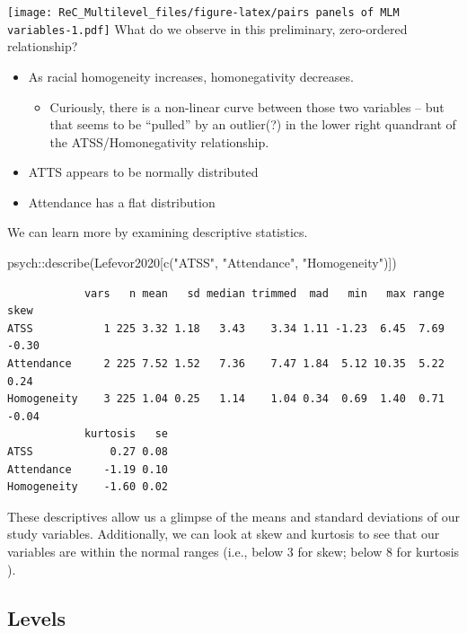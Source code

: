 \documentclass[
  english,
]{book}
\newenvironment{Shaded}{\begin{snugshade}}{\end{snugshade}}
\newcommand{\FunctionTok}[1]{\textcolor[rgb]{0.00,0.00,0.00}{#1}}
\newcommand{\NormalTok}[1]{#1}
\newcommand{\SpecialCharTok}[1]{\textcolor[rgb]{0.00,0.00,0.00}{#1}}
\newcommand{\StringTok}[1]{\textcolor[rgb]{0.31,0.60,0.02}{#1}}
\providecommand{\tightlist}{%
  \setlength{\itemsep}{0pt}\setlength{\parskip}{0pt}}
\begin{document}
\texttt{[image: ReC\_Multilevel\_files/figure-latex/pairs panels of MLM variables-1.pdf]}
What do we observe in this preliminary, zero-ordered relationship?

\begin{itemize}
\tightlist
\item
  As racial homogeneity increases, homonegativity decreases.

  \begin{itemize}
  \tightlist
  \item
    Curiously, there is a non-linear curve between those two variables -- but that seems to be ``pulled'' by an outlier(?) in the lower right quandrant of the ATSS/Homonegativity relationship.
  \end{itemize}
\item
  ATTS appears to be normally distributed
\item
  Attendance has a flat distribution
\end{itemize}

We can learn more by examining descriptive statistics.

\begin{Shaded}
\begin{Highlighting}[]
\NormalTok{psych}\SpecialCharTok{::}\FunctionTok{describe}\NormalTok{(Lefevor2020[}\FunctionTok{c}\NormalTok{(}\StringTok{"ATSS"}\NormalTok{, }\StringTok{"Attendance"}\NormalTok{, }\StringTok{"Homogeneity"}\NormalTok{)])}
\end{Highlighting}
\end{Shaded}

\begin{verbatim}
            vars   n mean   sd median trimmed  mad   min   max range  skew
ATSS           1 225 3.32 1.18   3.43    3.34 1.11 -1.23  6.45  7.69 -0.30
Attendance     2 225 7.52 1.52   7.36    7.47 1.84  5.12 10.35  5.22  0.24
Homogeneity    3 225 1.04 0.25   1.14    1.04 0.34  0.69  1.40  0.71 -0.04
            kurtosis   se
ATSS            0.27 0.08
Attendance     -1.19 0.10
Homogeneity    -1.60 0.02
\end{verbatim}

These descriptives allow us a glimpse of the means and standard deviations of our study variables. Additionally, we can look at skew and kurtosis to see that our variables are within the normal ranges (i.e., below 3 for skew; below 8 for kurtosis \citep{kline_principles_2016}).

\hypertarget{levels}{%
\subsection{Levels}\label{levels}}
\end{document}

